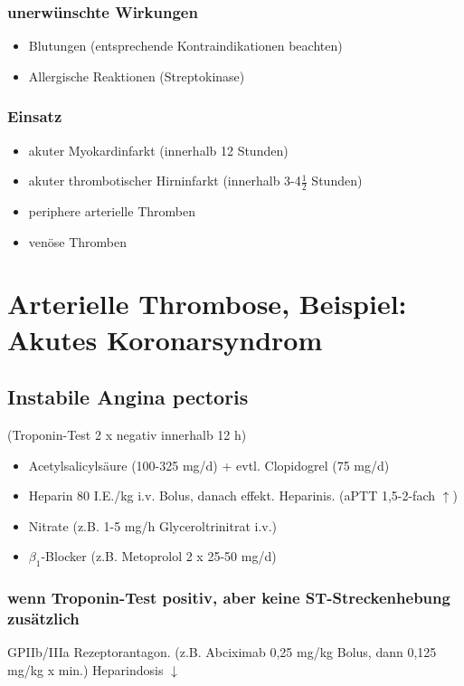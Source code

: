 \documentclass[10pt,a4paper]{report}
\begin{document}
\subsubsection{unerwünschte Wirkungen} %
\label{par:unerw_nschte}
\begin{itemize}
	\item Blutungen (entsprechende Kontraindikationen beachten)
	\item Allergische Reaktionen (Streptokinase)
\end{itemize}
\subsubsection{Einsatz} %
\label{par:einsatz}
\begin{itemize}
	\item akuter Myokardinfarkt (innerhalb 12 Stunden)
	\item akuter thrombotischer Hirninfarkt (innerhalb 3-4$\frac{1}{2}$ Stunden)
	\item periphere arterielle Thromben
	\item venöse Thromben
\end{itemize}
\section{Arterielle Thrombose, Beispiel: Akutes  Koronarsyndrom} %
\label{sec:arterielle_thrombose_beispiel_akutes_koronarsyndrom}
\subsection{Instabile Angina pectoris } %
\label{ssub:instabile_angina_pectoris_}
(Troponin-Test 2 x negativ innerhalb 12 h)
\begin{itemize}
	\item Acetylsalicylsäure (100-325 mg/d) + evtl. Clopidogrel (75 mg/d)
	\item Heparin 80 I.E./kg i.v. Bolus, danach effekt. Heparinis. (aPTT 1,5-2-fach $\uparrow$)
	\item Nitrate (z.B. 1-5 mg/h Glyceroltrinitrat i.v.)
	\item $\beta_1$-Blocker (z.B. Metoprolol 2 x 25-50 mg/d)
\end{itemize}
\subsubsection{wenn Troponin-Test positiv, aber keine ST-Streckenhebung zusätzlich} %
\label{par:wenn_troponin_test_positiv_aber_keine_st_streckenhebung_zus_tzlich}
GPIIb/IIIa Rezeptorantagon. (z.B. Abciximab 0,25 mg/kg Bolus, dann 0,125 mg/kg x min.) Heparindosis $\downarrow$
\end{document}
